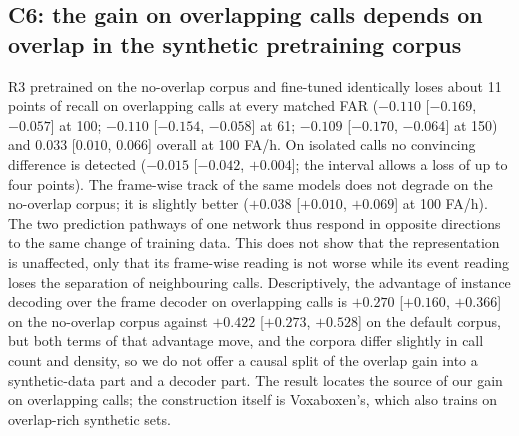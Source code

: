 \documentclass[10pt,twocolumn]{article}
\begin{document}
\subsection{C6: the gain on overlapping calls depends on overlap in the synthetic pretraining corpus}
\label{sec:noov}
R3 pretrained on the no-overlap corpus and fine-tuned identically loses about 11 points of recall on overlapping calls at every matched FAR ($-0.110$ [$-0.169$, $-0.057$] at 100; $-0.110$ [$-0.154$, $-0.058$] at 61; $-0.109$ [$-0.170$, $-0.064$] at 150) and $0.033$ [$0.010$, $0.066$] overall at 100 FA/h. On isolated calls no convincing difference is detected ($-0.015$ [$-0.042$, $+0.004$]; the interval allows a loss of up to four points). The frame-wise track of the same models does not degrade on the no-overlap corpus; it is slightly better ($+0.038$ [$+0.010$, $+0.069$] at 100 FA/h). The two prediction pathways of one network thus respond in opposite directions to the same change of training data. This does not show that the representation is unaffected, only that its frame-wise reading is not worse while its event reading loses the separation of neighbouring calls. Descriptively, the advantage of instance decoding over the frame decoder on overlapping calls is $+0.270$ [$+0.160$, $+0.366$] on the no-overlap corpus against $+0.422$ [$+0.273$, $+0.528$] on the default corpus, but both terms of that advantage move, and the corpora differ slightly in call count and density, so we do not offer a causal split of the overlap gain into a synthetic-data part and a decoder part. The result locates the source of our gain on overlapping calls; the construction itself is Voxaboxen's, which also trains on overlap-rich synthetic sets.
\end{document}

